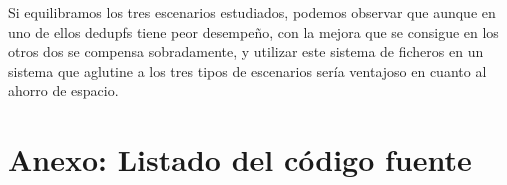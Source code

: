 \documentclass[12pt,a4paper]{article}
\begin{document}
Si equilibramos los tres escenarios estudiados, podemos observar que aunque en uno de ellos dedupfs tiene peor desempeño, con la mejora que se consigue en los otros dos se compensa sobradamente, y utilizar este sistema de ficheros en un sistema que aglutine a los tres tipos de escenarios sería ventajoso en cuanto al ahorro de espacio.



\newpage
\section{Anexo: Listado del código fuente}

\subsection{}

\end{document}

